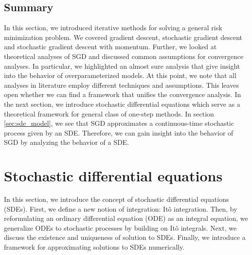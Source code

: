\documentclass[12pt]{article}
\theoremstyle{definition}
\numberwithin{equation}{section}
\begin{document}
\subsection{Summary}
In this section, we introduced iterative methods for solving a general risk minimization problem. We covered gradient descent, stochastic gradient descent and stochastic gradient descent with momentum. Further, we looked at theoretical analyses of SGD and discussed common assumptions for convergence analyses. In particular, we highlighted an almost sure analysis that give insight into the behavior of overparameterized models. 
At this point, we note that all analyses in literature employ different techniques and assumptions. This leaves open whether we can find a framework that unifies the convergence analysis. In the next section, we introduce stochastic differential equations which serve as a theoretical framework for general class of one-step methods. In section \ref{sec:sde_model}, we see that SGD approximates a continuous-time stochastic process given by an SDE. Therefore, we can gain insight into the behavior of SGD by analyzing the behavior of a SDE.

\section{Stochastic differential equations}
\label{sec:BackgroundSDETheory}
In this section, we introduce the concept of stochastic differential equations (SDEs). First, we define a new notion of integration: Itô integration. Then, by reformulating an ordinary differential equation (ODE) as an integral equation, we generalize ODEs to stochastic processes by building on Itô integrals. Next, we discuss the existence and uniqueness of solution to SDEs. Finally, we introduce a framework for approximating solutions to SDEs numerically.
\end{document}
